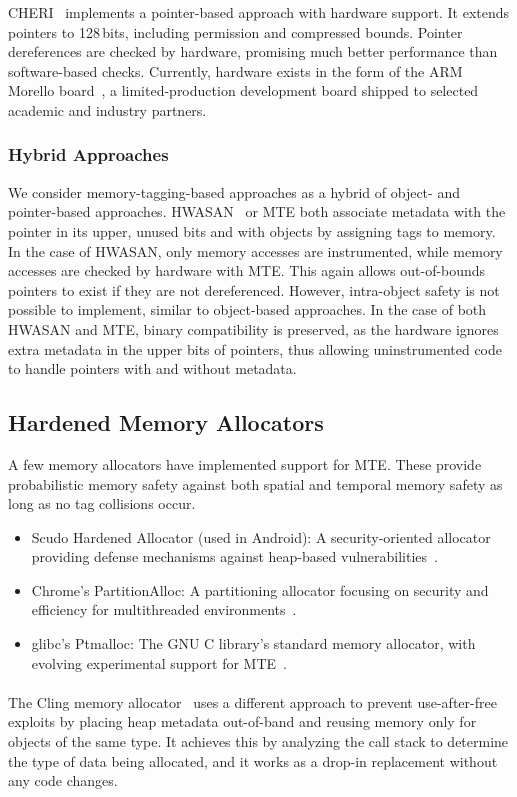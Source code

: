CHERI~\cite{woodruff2014cheri} implements a pointer-based approach with hardware support.
It extends pointers to 128\,bits, including permission and compressed bounds.
Pointer dereferences are checked by hardware, promising much better performance than software-based checks.
Currently, hardware exists in the form of the ARM Morello board~\cite{UCAM-CL-TR-982}, a limited-production development board shipped to selected academic and industry partners.

\subsubsection{Hybrid Approaches}

We consider memory-tagging-based approaches as a hybrid of object- and pointer-based approaches.
\Ac{HWASAN}~\cite{serebryany2018memory} or \ac{MTE} both associate metadata with the pointer in its upper, unused bits and with objects by assigning tags to memory.
In the case of \ac{HWASAN}, only memory accesses are instrumented, while memory accesses are checked by hardware with \ac{MTE}.
This again allows out-of-bounds pointers to exist if they are not dereferenced.
However, intra-object safety is not possible to implement, similar to object-based approaches.
In the case of both \ac{HWASAN} and \ac{MTE}, binary compatibility is preserved, as the hardware ignores extra metadata in the upper bits of pointers, thus allowing uninstrumented code to handle pointers with and without metadata.

\subsection{Hardened Memory Allocators}
\label{subsec:hardened-memory-allocators}

A few memory allocators have implemented support for \ac{MTE}.
These provide probabilistic memory safety against both spatial and temporal memory safety as long as no tag collisions occur.

\begin{itemize}
    \item Scudo Hardened Allocator (used in Android): A security-oriented allocator providing defense mechanisms against heap-based vulnerabilities~\cite{scudo_allocator}.
    \item Chrome's PartitionAlloc: A partitioning allocator focusing on security and efficiency for multithreaded environments~\cite{chrome_partition_alloc}.
    \item glibc's Ptmalloc: The GNU C library's standard memory allocator, with evolving experimental support for \ac{MTE}~\cite{glibc_ptmalloc}.
\end{itemize}

\paragraph{}
The Cling memory allocator~\cite{akritidis2010cling} uses a different approach to prevent use-after-free exploits by placing heap metadata out-of-band and reusing memory only for objects of the same type.
It achieves this by analyzing the call stack to determine the type of data being allocated, and it works as a drop-in replacement without any code changes.
